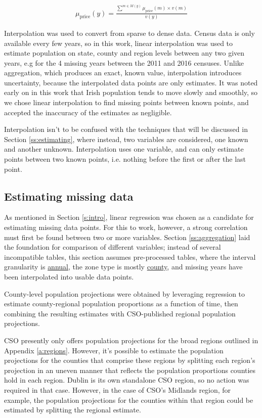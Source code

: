 \documentclass[twocolumn]{article}
\begin{document}
\begin{align}
    \mu_{\text{price}}(y) = \frac{\sum^{m \in M(y)}\mu_{\text{price}}(m) \times v(m)}
    {v(y)}\label{eq:weighted_mean}
\end{align}

Interpolation was used to convert from sparse to dense data.  Census data
is only available every few years, so in this work, linear interpolation was
used to estimate population on state, county and region levels between any two
given years, e.g for the 4 missing years between the 2011 and 2016 censuses.
Unlike aggregation, which produces an
exact, known value, interpolation introduces uncertainty, because the
interpolated data points are only estimates.  It was noted early on in this
work that Irish population tends to move slowly and smoothly, so we chose
linear interpolation to find missing points between known points, and accepted
the inaccuracy of the estimates as negligible.

Interpolation isn't to be confused with the techniques that will be discussed in
Section \ref{ss:estimating}, where instead, two variables are considered, one known
and another unknown.  Interpolation uses one variable, and can only estimate points between
two known points, i.e. nothing before the first or after the last point.

\subsection{Estimating missing data\label{ss:estimating}}
As mentioned in Section \ref{s:intro}, linear regression was chosen as a candidate for
estimating missing data points.  For this to work, however, a strong
correlation must first be found between two or more variables.  Section
\ref{ss:aggregation} laid the foundation for comparison of different variables;
instead of several incompatible tables, this section assumes pre-processed
tables, where the interval granularity is \underline{annual}, the zone type is
mostly \underline{county}, and missing years have been interpolated into usable data points.

County-level population projections were obtained by leveraging
regression to estimate county-regional population proportions as a function of
time, then combining the resulting estimates with CSO-published regional population
projections.

CSO presently only offers population projections for the broad
regions outlined in Appendix \ref{a:regions}.  However, it's possible to
estimate the population projections for the counties that comprise these
regions by splitting each region's projection in an uneven manner that
reflects the population proportions counties hold in each region.  Dublin is its
own standalone CSO region, so no action was required in that case.  However, in
the case of CSO's Midlands region, for example, the population projections for the counties
within that region could be estimated by splitting the regional estimate.
\end{document}
